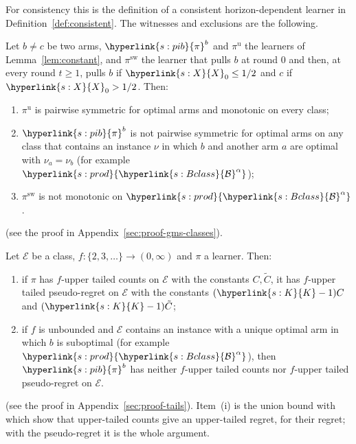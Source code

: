 \documentclass[11pt]{article}
\newcommand{\dt}[1]{\hypertarget{#1}{}}
\newcommand{\sy}[2]{{\hyperlink{#1}{#2}}}
\newcommand{\Bclass}{\sy{s:Bclass}{\mathcal{B}}}
\newcommand{\Karms}{\sy{s:K}{K}}
\newcommand{\powc}[1]{\sy{s:prod}{#1^{\alpha}}}
\newcommand{\Xr}{\sy{s:X}{X}}
\newcommand{\Cons}{\sy{s:pib}{\pi}}
\begin{document}
For consistency this is the definition of a consistent horizon-dependent learner in
Definition~\ref{def:consistent}. The witnesses and exclusions are the following.

\begin{lemma}\label{lem:gms-classes}
Let $b\ne c$ be two arms, $\Cons^b$ and $\pi^{\mathrm{u}}$ the learners of Lemma~\ref{lem:constant},
\dt{s:pisw}and $\pi^{\mathrm{sw}}$ the learner that pulls $b$ at round $0$ and then, at every round
$t\ge1$, pulls $b$ if $\Xr_0\le1/2$ and $c$ if $\Xr_0>1/2$. Then:
\begin{enumerate}[label=(\roman*)]
  \item $\pi^{\mathrm{u}}$ is pairwise symmetric for optimal arms and monotonic on every class;
  \item $\Cons^b$ is not pairwise symmetric for optimal arms on any class that contains an instance
  $\nu$ in which $b$ and another arm $a$ are optimal with $\nu_a=\nu_b$ (for example $\powc{\Bclass}$);
  \item $\pi^{\mathrm{sw}}$ is not monotonic on $\powc{\Bclass}$.
\end{enumerate}
\end{lemma}
(see the proof in Appendix~\ref{sec:proof-gms-classes}).

\begin{lemma}\label{lem:tails}
Let $\mathcal E$ be a class, $f:\{2,3,\dots\}\to(0,\infty)$ and $\pi$ a learner. Then:
\begin{enumerate}[label=(\roman*)]
  \item if $\pi$ has $f$-upper tailed counts on $\mathcal E$ with the constants $C,\tilde C$, it has
  $f$-upper tailed pseudo-regret on $\mathcal E$ with the constants $(\Karms-1)C$ and $(\Karms-1)\tilde C$;
  \item if $f$ is unbounded and $\mathcal E$ contains an instance with a unique optimal arm in which
  $b$ is suboptimal (for example $\powc{\Bclass}$), then $\Cons^b$ has neither $f$-upper tailed counts
  nor $f$-upper tailed pseudo-regret on $\mathcal E$.
\end{enumerate}
\end{lemma}
(see the proof in Appendix~\ref{sec:proof-tails}). Item~(i) is the union bound with which
\citet[Proposition~2.1]{SA11} show that upper-tailed counts give an upper-tailed regret, for their
regret; with the pseudo-regret it is the whole argument.
\end{document}
